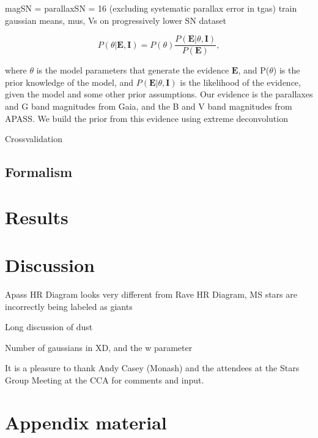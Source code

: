 \documentclass[iop]{emulateapj}
\begin{document}
magSN = parallaxSN = 16 (excluding systematic parallax error in tgas)
train gaussian means, mus, Vs on progressively lower SN dataset

\begin{equation}
\label{eq:bayes}
P(\theta|\textbf{E}, \textbf{I}) = P(\theta ) \frac{P(\textbf{E} |\theta,\textbf{I})}{P(\textbf{E})},
\end{equation}


where $\theta$ is the model parameters that generate the evidence $\textbf{E}$, and P($\theta$) is the prior knowledge of the model, and $P(\textbf{E} |\theta,\textbf{I})$ is the likelihood of the evidence, given the model and some other prior assumptions. Our evidence is the parallaxes and G band magnitudes from Gaia, and the B and V band magnitudes from APASS. We build the prior from this evidence using extreme deconvolution


Crossvalidation

\subsection{Formalism} \label{bozomath}

\section{Results}

\section{Discussion}
Apass HR Diagram looks very different from Rave HR Diagram, MS stars are incorrectly being labeled as giants

Long discussion of dust

Number of gaussians in XD, and the w parameter



\acknowledgments It is a pleasure to thank Andy Casey (Monash) and the
attendees at the Stars Group Meeting at the CCA for comments and
input.

\appendix

\section{Appendix material}


\begin{thebibliography}{}
\end{thebibliography}

\clearpage
\end{document}
